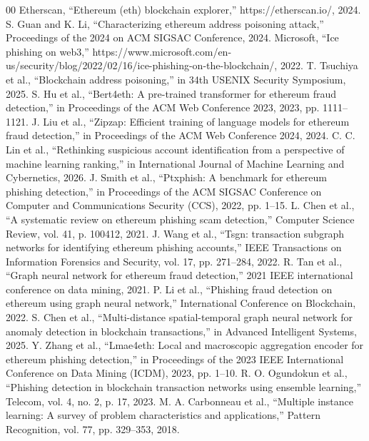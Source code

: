 \documentclass[conference]{IEEEtran}
\begin{document}
\begin{thebibliography}{00}
 Etherscan, ``Ethereum (eth) blockchain explorer,'' https://etherscan.io/, 2024.
 S. Guan and K. Li, ``Characterizing ethereum address poisoning attack,'' Proceedings of the 2024 on ACM SIGSAC Conference, 2024.
 Microsoft, ``Ice phishing on web3,'' https://www.microsoft.com/en-us/security/blog/2022/02/16/ice-phishing-on-the-blockchain/, 2022.
 T. Tsuchiya et al., ``Blockchain address poisoning,'' in 34th USENIX Security Symposium, 2025.
 S. Hu et al., ``Bert4eth: A pre-trained transformer for ethereum fraud detection,'' in Proceedings of the ACM Web Conference 2023, 2023, pp. 1111--1121.
 J. Liu et al., ``Zipzap: Efficient training of language models for ethereum fraud detection,'' in Proceedings of the ACM Web Conference 2024, 2024.
 C. C. Lin et al., ``Rethinking suspicious account identification from a perspective of machine learning ranking,'' in International Journal of Machine Learning and Cybernetics, 2026.
 J. Smith et al., ``Ptxphish: A benchmark for ethereum phishing detection,'' in Proceedings of the ACM SIGSAC Conference on Computer and Communications Security (CCS), 2022, pp. 1--15.
 L. Chen et al., ``A systematic review on ethereum phishing scam detection,'' Computer Science Review, vol. 41, p. 100412, 2021.
 J. Wang et al., ``Tsgn: transaction subgraph networks for identifying ethereum phishing accounts,'' IEEE Transactions on Information Forensics and Security, vol. 17, pp. 271--284, 2022.
 R. Tan et al., ``Graph neural network for ethereum fraud detection,'' 2021 IEEE international conference on data mining, 2021.
 P. Li et al., ``Phishing fraud detection on ethereum using graph neural network,'' International Conference on Blockchain, 2022.
 S. Chen et al., ``Multi-distance spatial-temporal graph neural network for anomaly detection in blockchain transactions,'' in Advanced Intelligent Systems, 2025.
 Y. Zhang et al., ``Lmae4eth: Local and macroscopic aggregation encoder for ethereum phishing detection,'' in Proceedings of the 2023 IEEE International Conference on Data Mining (ICDM), 2023, pp. 1--10.
 R. O. Ogundokun et al., ``Phishing detection in blockchain transaction networks using ensemble learning,'' Telecom, vol. 4, no. 2, p. 17, 2023.
 M. A. Carbonneau et al., ``Multiple instance learning: A survey of problem characteristics and applications,'' Pattern Recognition, vol. 77, pp. 329--353, 2018.

\end{thebibliography}
\end{document}
